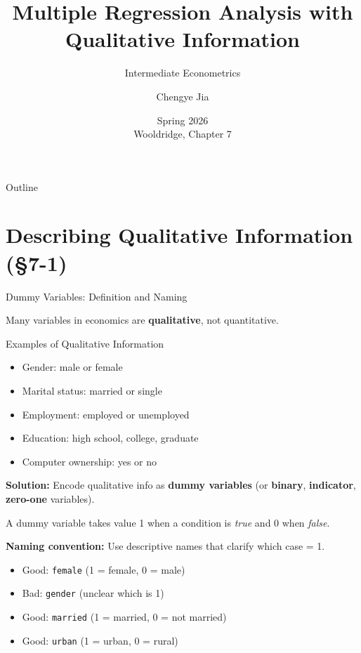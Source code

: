 \documentclass[aspectratio=169, 12pt]{beamer}
\title[L6: Qualitative Data]{Multiple Regression Analysis with Qualitative Information}
\subtitle{Intermediate Econometrics}
\author[SUFE Econometrics]{Chengye Jia}
\institute{%
  Department of Economics \\
  Shandong University of Finance and Economics}
\date{Spring 2026 \\ \smallskip \scriptsize Wooldridge, Chapter 7}
\begin{document}

\begin{frame}[plain]
  \titlepage
\end{frame}

\begin{frame}[shrink=10]{Outline}
  \tableofcontents
\end{frame}

\section{Describing Qualitative Information (\S7-1)}

\begin{frame}[shrink=20]{Dummy Variables: Definition and Naming}

  Many variables in economics are \textbf{qualitative}, not quantitative.

  \medskip

  \begin{examplebox}{Examples of Qualitative Information}
    \begin{itemize}
      \item Gender: male or female
      \item Marital status: married or single
      \item Employment: employed or unemployed
      \item Education: high school, college, graduate
      \item Computer ownership: yes or no
    \end{itemize}
  \end{examplebox}

  \medskip

  \textbf{Solution:} Encode qualitative info as \textbf{dummy variables} (or \textbf{binary}, \textbf{indicator}, \textbf{zero-one} variables).

  \begin{highlightbox}
    A dummy variable takes value 1 when a condition is \textit{true} and 0 when \textit{false}.

    \textbf{Naming convention:} Use descriptive names that clarify which case = 1.
    \begin{itemize}
      \item Good: \texttt{female} (1 = female, 0 = male)
      \item Bad: \texttt{gender} (unclear which is 1)
      \item Good: \texttt{married} (1 = married, 0 = not married)
      \item Good: \texttt{urban} (1 = urban, 0 = rural)
    \end{itemize}
  \end{highlightbox}


\end{frame}
\end{document}
